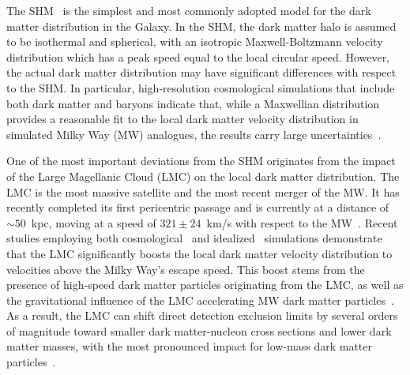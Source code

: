 \documentclass[12pt]{article}
\begin{document}
The SHM~\cite{PhysRevD.33.3495} is the simplest and most commonly adopted model for the dark matter distribution in the Galaxy. In the SHM, the dark matter halo is assumed to be isothermal and spherical, with an isotropic Maxwell-Boltzmann velocity distribution which has a peak speed equal to the local circular speed. However, the actual dark matter distribution may have significant differences with respect to the SHM. In particular, high-resolution cosmological simulations that include both dark matter and baryons indicate that, while a Maxwellian distribution provides a reasonable fit to the local dark matter velocity distribution in simulated Milky Way (MW) analogues, the results carry large uncertainties~\cite{Bozorgnia:2016ogo, Kelso:2016qqj, Sloane:2016kyi,  Bozorgnia:2017brl,  Bozorgnia:2019mjk, Poole-McKenzie:2020dbo, Lawrence:2022niq, Kuhlen:2013tra, Lacroix:2020lhn, Santos-Santos:2023ubx, Herrera:2023fpq, Herrera:2021puj}.

One of the most important deviations from the SHM originates from the impact of the Large Magellanic Cloud (LMC) on the local dark matter distribution.
The LMC is the most massive satellite and the most recent merger of the MW. It has recently completed its first pericentric passage and is currently at a distance of $\sim 50$~kpc, moving at a speed of $321 \pm 24$~km/s  with respect to the MW~\cite{Besla:2007kf, Kallivayalil:2013xb,Patel:2017,Pietrzynski:2019}. Recent studies employing both cosmological~\cite{Smith-Orlik:2023kyl, Reynoso-Cordova:2024xqz} and idealized~\cite{Besla:2019xbx, Donaldson:2021byu} simulations demonstrate that the LMC significantly boosts the local dark matter velocity distribution to velocities above the Milky Way’s escape speed. This boost stems from the presence of high-speed dark matter particles originating from the LMC, as well as the gravitational influence of the LMC accelerating MW dark matter particles~\cite{Besla:2019xbx, Smith-Orlik:2023kyl}. As a result, the LMC can shift  direct detection exclusion limits by several orders of magnitude toward smaller dark matter-nucleon cross sections and lower dark matter masses, with the most pronounced impact for low-mass dark matter particles~\cite{Smith-Orlik:2023kyl, Reynoso-Cordova:2024xqz}.
\end{document}
